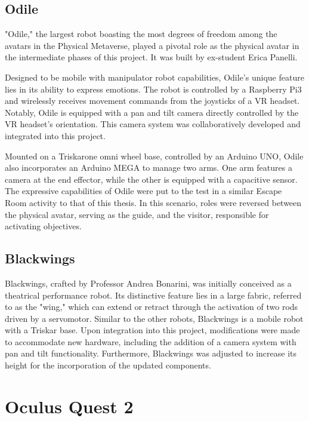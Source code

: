 \documentclass{Configuration_Files/PoliMi3i_thesis}
\begin{document}
\subsection{Odile}
"Odile," the largest robot boasting the most degrees of freedom among the avatars in the Physical Metaverse, played a pivotal role as the physical avatar in the intermediate phases of this project.
It was built by ex-student Erica Panelli.

Designed to be mobile with manipulator robot capabilities, Odile's unique feature lies in its ability to express emotions. The robot is controlled by a Raspberry Pi3 and wirelessly receives movement commands from the joysticks of a VR headset. Notably, Odile is equipped with a pan and tilt camera directly controlled by the VR headset's orientation. This camera system was collaboratively developed and integrated into this project.

Mounted on a Triskarone omni wheel base, controlled by an Arduino UNO, Odile also incorporates an Arduino MEGA to manage two arms. One arm features a camera at the end effector, while the other is equipped with a capacitive sensor. The expressive capabilities of Odile were put to the test in a similar Escape Room activity to that of this thesis. In this scenario, roles were reversed between the physical avatar, serving as the guide, and the visitor, responsible for activating objectives.

\subsection{Blackwings}
Blackwings, crafted by Professor Andrea Bonarini, was initially conceived as a theatrical performance robot. Its distinctive feature lies in a large fabric, referred to as the "wing," which can extend or retract through the activation of two rods driven by a servomotor. Similar to the other robots, Blackwings is a mobile robot with a Triskar base. Upon integration into this project, modifications were made to accommodate new hardware, including the addition of a camera system with pan and tilt functionality. Furthermore, Blackwings was adjusted to increase its height for the incorporation of the updated components.

\section{Oculus Quest 2}
\end{document}
